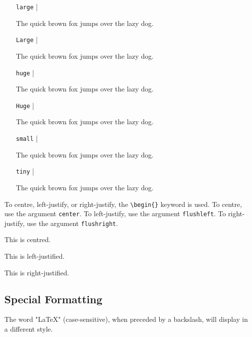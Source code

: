 \documentclass[11pt]{article}
\begin{document}
\begin{itemize}
	\item[\texttt{large} |] 
		\begin{large}
			The quick brown fox jumps over the lazy dog.
		\end{large}
	\item[\texttt{Large} |]
		\begin{Large}
			The quick brown fox jumps over the lazy dog.
		\end{Large}
	\item[\texttt{huge} |]
		\begin{huge}
			The quick brown fox jumps over the lazy dog.
		\end{huge}
	\item[\texttt{Huge} |]
		\begin{Huge}
			The quick brown fox jumps over the lazy dog.
		\end{Huge}
	\item[\texttt{small} |]
		\begin{small}
			The quick brown fox jumps over the lazy dog.
		\end{small}
	\item[\texttt{tiny} |]
		\begin{tiny}
			The quick brown fox jumps over the lazy dog.
		\end{tiny}
\end{itemize}

To centre, left-justify, or right-justify, the \texttt{\textbackslash begin\{\}} keyword is used. To centre, use the argument \texttt{center}. To left-justify, use the argument \texttt{flushleft}. To right-justify, use the argument \texttt{flushright}.

\begin{center}
	This is centred.
\end{center}

\begin{flushleft}
	This is left-justified.
\end{flushleft}

\begin{flushright}
	This is right-justified.
\end{flushright}

\subsection{Special Formatting}

The word "LaTeX" (case-sensitive), when preceded by a backslash, will display in a different style. 
\end{document}
